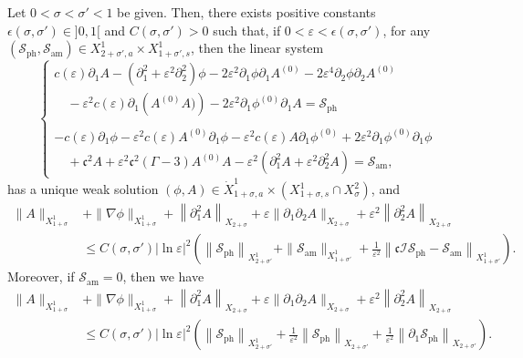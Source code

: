 \documentclass[AHL,Unicode,longabstracts,published]{cedram}
\newcommand*\p{\partial}
\newcommand{\amm}{\mathrm{am}}
\newcommand{\phl}{\mathrm{ph}}
\newcommand*\BI{\mathcal{I}}
\newcommand*\BS{\mathcal{S}}
\newcommand*\cs{{\mathfrak c}}
\newcommand*\ls{\leqslant }
\newcommand*\e{\varepsilon}
\newcommand*\ep{\epsilon}
\newcommand*\lne{\lvert \ln \varepsilon \rvert}
\newcommand*\s{\sigma}
\begin{document}
\begin{prop}\label{esti-apriori}
Let $ 0 < \s < \s' < 1 $ be given. Then, there exists positive constants $ \ep (\s, \s') \in]0,1[$ and $ C (\s, \s') > 0 $ such that, if $ 0 < \e < \ep(\s, \s') $, for any $ (\BS_{\phl}, \BS_{\amm})
\in X^{1}_{2+\s', a} \times X^{1}_{1+\s', s} $, then the linear system
\begin{equation}\label{Mad_lineaire}
\left\{
\begin{array}{ll}
c(\e) \p_{1} A - \left(\p_{1}^2 + \e^2 \p^2_{2}\right) \phi - 2 \e^2 \p_{1} \phi \p_{1} A^{(0)} - 2 \e^4 \p_{2} \phi \p_{2} A^{(0)}
\\
\quad - \e^2 c(\e) \p_1 \left(A^{(0)} A)\right) - 2 \e^2 \p_{1} \phi^{(0)} \p_{1} A = \BS_{\phl} \\ \ \\
- c(\e) \p_{1} \phi - \e^2 c(\e) A^{(0)} \p_1 \phi - \e^2 c(\e) A \p_1 \phi^{(0)} + 2 \e^2 \p_{1} \phi^{(0)} \p_{1} \phi
\\
\quad + \cs^2 A + \e^2 \cs^2 (\Gamma -3) A^{(0)} A - \e^2 \left(\p_{1}^2 A + \e^2 \p_{2}^2 A\right) = \BS_{\amm},
\end{array}\right.
\end{equation}
has a unique weak solution $ (\phi, A) \in \dot{X}^{1}_{ 1+\s,a} \times (X^{1}_{ 1+ \s, s} \cap X^2_\s) $, and
\begin{align*}
\| A \|_{ X^{1}_{ 1+ \s} } & + \| \nabla \phi \|_{ X^{1}_{1 + \s} } + \left\| \p_1^2 A \right\|_{ X_{2 +\s} } + \e \| \p_1 \p_2 A \|_{ X_{2 +\s} } + \e^2 \left\| \p_2^2 A \right\|_{ X_{2+\s} }
\\ & \ls C (\s,\s') \lne^2
\left(
\left\| \BS_{\phl} \right\|_{ X^{1}_{ 2+\s'} } + \| \BS_{\amm} \|_{ X^{ 1}_{1+ \s'} } + \frac{1}{\e^2} \left\| \cs \BI \BS_{\phl} - \BS_{\amm} \right\|_{ X^{1}_{1+\s'} }
\right).
\end{align*}
Moreover, if $ \BS_{\amm} = 0 $, then we have
\begin{align*}
\| A \|_{ X^{1}_{ 1+\s} } & + \| \nabla \phi \|_{ X^{1}_{ 1 +\s} } + \left\| \p_1^2 A \right\|_{ X_{2 +\s} } + \e \| \p_1 \p_2 A \|_{ X_{2 +\s} } + \e^2 \left\| \p_2^2 A \right\|_{ X_{2+\s} }
\\& \ls C (\s, \s') \lne^2
\left(
\left\| \BS_{\phl} \right\|_{ X^{1}_{2+\s' } } + \frac{1}{\e^2} \left\| \BS_{\phl} \right\|_{ X_{ 2 + \s' } } + \frac{1}{\e^2} \left\| \p_1 \BS_{\phl} \right\|_{ X_{ 2 + \s' } }
\right).
\end{align*}
\end{prop}
\end{document}
